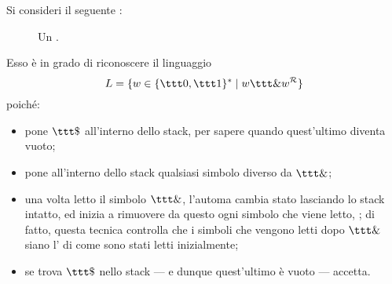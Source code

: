 \documentclass[a4paper, 12pt]{report}
\begin{document}
    \begin{example}[\PDA]
        Si consideri il seguente \PDA:

        \begin{figure}[H]
            \centering
             \caption{Un \PDA.}
        \end{figure}

        Esso è in grado di riconoscere il linguaggio $$L=\{w \in \{\ttt 0, \ttt 1\}^* \mid w \ttt \& w ^\mathcal{R}\}$$ poiché:

        \begin{itemize}
            \item pone $\ttt \$$ all'interno dello stack, per sapere quando quest'ultimo diventa vuoto;
            \item pone all'interno dello stack qualsiasi simbolo diverso da $\ttt \&$;
            \item una volta letto il simbolo $\ttt \&$, l'automa cambia stato lasciando lo stack intatto, ed inizia a rimuovere da questo ogni simbolo che viene letto, ; di fatto, questa tecnica controlla che i simboli che vengono letti dopo $\ttt \&$ siano l' di come sono stati letti inizialmente;
            \item se trova $\ttt \$$ nello stack --- e dunque quest'ultimo è vuoto --- accetta.
        \end{itemize}
    \end{example}
\end{document}
